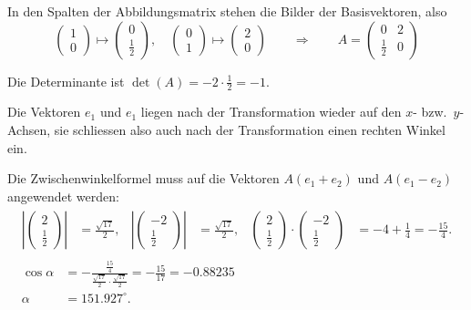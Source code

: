 \begin{loesung}
In den Spalten der Abbildungsmatrix stehen die Bilder der Basisvektoren, also
\[
\begin{pmatrix}1\\0\end{pmatrix}\mapsto\begin{pmatrix}0\\\frac12\end{pmatrix}
,\quad
\begin{pmatrix}0\\1\end{pmatrix}\mapsto\begin{pmatrix}2\\0\end{pmatrix}
\qquad
\Rightarrow\qquad
A=\begin{pmatrix}
0&2\\
\frac12&0
\end{pmatrix}
\]
\begin{teilaufgaben}
\item
Die Determinante ist $\det(A)=-2\cdot\frac12=-1.$
\item
Die Vektoren $e_1$ und $e_1$ liegen nach der Transformation wieder auf
den $x$- bzw.~$y$-Achsen, sie schliessen also auch nach der Transformation
einen rechten Winkel ein.
\item
Die Zwischenwinkelformel muss auf die Vektoren $A(e_1+e_2)$ und
$A(e_1-e_2)$ angewendet werden:
\begin{gather}
\begin{aligned}
\left|\begin{pmatrix}2\\\frac12\end{pmatrix}\right|&=\frac{\sqrt{17}}2,&
\left|\begin{pmatrix}-2\\\frac12\end{pmatrix}\right|&=\frac{\sqrt{17}}2,&
\begin{pmatrix}2\\\frac12\end{pmatrix}
\cdot
\begin{pmatrix}-2\\\frac12\end{pmatrix}
&=-4+\frac14=-\frac{15}4.
\end{aligned}
\\
\begin{aligned}
\cos\alpha&=-\frac{\frac{15}{4}}{\frac{\sqrt{17}}{2}\cdot\frac{\sqrt{17}}2}
=-\frac{15}{17}=-0.88235\\
\alpha&=151.927^\circ.
\end{aligned}
\end{gather}
\end{teilaufgaben}
\end{loesung}

